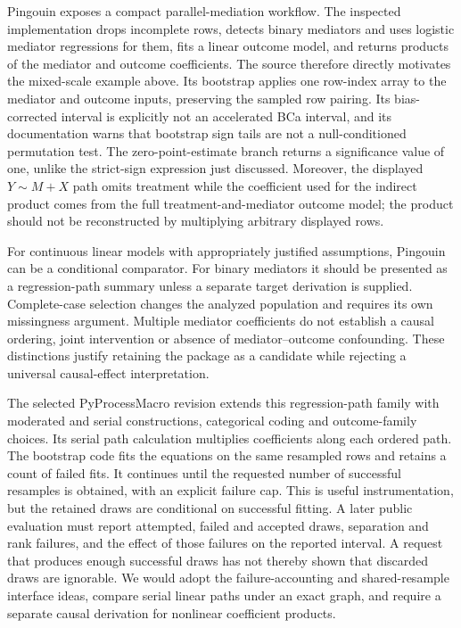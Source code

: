Pingouin exposes a compact parallel-mediation workflow. The inspected implementation drops incomplete rows, detects binary mediators and uses logistic mediator regressions for them, fits a linear outcome model, and returns products of the mediator and outcome coefficients. The source therefore directly motivates the mixed-scale example above. Its bootstrap applies one row-index array to the mediator and outcome inputs, preserving the sampled row pairing. Its bias-corrected interval is explicitly not an accelerated BCa interval, and its documentation warns that bootstrap sign tails are not a null-conditioned permutation test. The zero-point-estimate branch returns a significance value of one, unlike the strict-sign expression just discussed. Moreover, the displayed $Y\sim M+X$ path omits treatment while the coefficient used for the indirect product comes from the full treatment-and-mediator outcome model; the product should not be reconstructed by multiplying arbitrary displayed rows. \citep{exec25_pymed_pingouin}

For continuous linear models with appropriately justified assumptions, Pingouin can be a conditional comparator. For binary mediators it should be presented as a regression-path summary unless a separate target derivation is supplied. Complete-case selection changes the analyzed population and requires its own missingness argument. Multiple mediator coefficients do not establish a causal ordering, joint intervention or absence of mediator--outcome confounding. These distinctions justify retaining the package as a candidate while rejecting a universal causal-effect interpretation. \citep{exec25_pymed_pingouin,exec25_pymed_choice}

The selected PyProcessMacro revision extends this regression-path family with moderated and serial constructions, categorical coding and outcome-family choices. Its serial path calculation multiplies coefficients along each ordered path. The bootstrap code fits the equations on the same resampled rows and retains a count of failed fits. It continues until the requested number of successful resamples is obtained, with an explicit failure cap. This is useful instrumentation, but the retained draws are conditional on successful fitting. A later public evaluation must report attempted, failed and accepted draws, separation and rank failures, and the effect of those failures on the reported interval. A request that produces enough successful draws has not thereby shown that discarded draws are ignorable. We would adopt the failure-accounting and shared-resample interface ideas, compare serial linear paths under an exact graph, and require a separate causal derivation for nonlinear coefficient products. \citep{exec25_pymed_process,exec25_pymed_choice}

